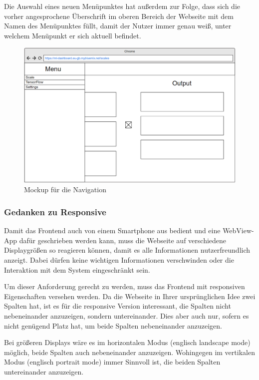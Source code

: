 Die Auswahl eines neuen Menüpunktes hat außerdem zur Folge, dass sich die vorher angesprochene Überschrift im oberen
Bereich der Webseite mit dem Namen des Menüpunktes füllt, damit der Nutzer immer genau weiß, unter welchem Menüpunkt
er sich aktuell befindet.

\begin{figure}[h]
    \centering
    \includegraphics[width=\textwidth]{images/kapitel_4/mockup_scale_menu.png}
    \caption{Mockup für die Navigation}
    \label{fig:umsetzung_mockup_scale_menu}
\end{figure}

\subsubsection{Gedanken zu Responsive}
Damit das Frontend auch von einem Smartphone aus bedient und eine WebView-App dafür geschrieben werden kann, muss die
Webseite auf verschiedene Displaygrößen so reagieren können, damit es alle Informationen nutzerfreundlich anzeigt. Dabei
dürfen keine wichtigen Informationen verschwinden oder die Interaktion mit dem System eingeschränkt sein.

Um dieser Anforderung gerecht zu werden, muss das Frontend mit responsiven Eigenschaften versehen werden. Da die
Webseite in Ihrer ursprünglichen Idee zwei Spalten hat, ist es für die responsive Version interessant, die Spalten nicht
nebeneinander anzuzeigen, sondern untereinander. Dies aber auch nur, sofern es nicht genügend Platz hat, um beide
Spalten nebeneinander anzuzeigen.

Bei größeren Displays wäre es im horizontalen Modus (englisch landscape mode) möglich, beide Spalten auch nebeneinander
anzuzeigen. Wohingegen im vertikalen Modus (englisch portrait mode) immer Sinnvoll ist, die beiden Spalten untereinander
anzuzeigen.

